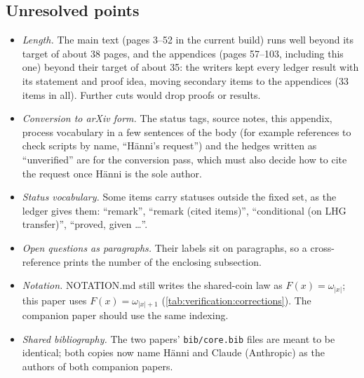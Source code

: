 \subsection{Unresolved points}\label{app:verification:unresolved}

\begin{itemize}[leftmargin=*]
\item \emph{Length.} The main text (pages 3--52 in the current build) runs well beyond its target of about 38 pages, and the appendices (pages 57--103, including this one) beyond their target of about 35: the writers kept every ledger result with its statement and proof idea, moving secondary items to the appendices (33 items in all). Further cuts would drop proofs or results.
\item \emph{Conversion to arXiv form.} The status tags, source notes, this appendix, process vocabulary in a few sentences of the body (for example references to check scripts by name, ``H\"anni's request'') and the hedges written as ``unverified'' are for the conversion pass, which must also decide how to cite the request \citep{hanni2026request} once H\"anni is the sole author.
\item \emph{Status vocabulary.} Some items carry statuses outside the fixed set, as the ledger gives them: ``remark'', ``remark (cited items)'', ``conditional (on LHG transfer)'', ``proved, given \ldots''.
\item \emph{Open questions as paragraphs.} Their labels sit on paragraphs, so a cross-reference prints the number of the enclosing subsection.
\item \emph{Notation.} NOTATION.md still writes the shared-coin law as $F(x)=\omega_{|x|}$; this paper uses $F(x)=\omega_{|x|+1}$ (\cref{tab:verification:corrections}). The companion paper should use the same indexing.
\item \emph{Shared bibliography.} The two papers' \texttt{bib/core.bib} files are meant to be identical; both copies now name H\"anni and Claude (Anthropic) as the authors of both companion papers.
\end{itemize}
